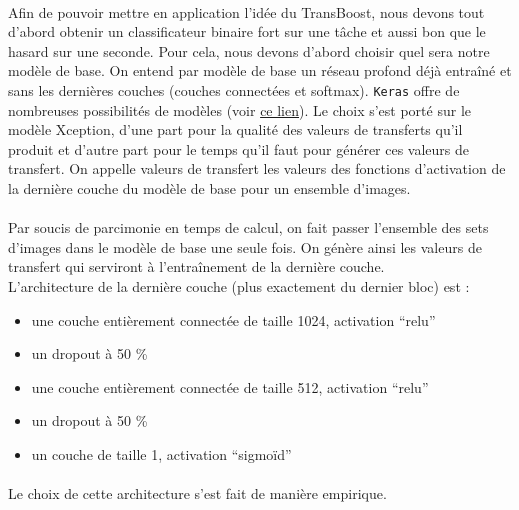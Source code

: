 \documentclass[11 pt]{article}
\begin{document}
\paragraph{}Afin de pouvoir mettre en application l’idée du TransBoost, nous devons tout d’abord obtenir un classificateur binaire fort sur une tâche et aussi bon que le hasard sur une seconde. Pour cela, nous devons d’abord choisir quel sera notre modèle de base. On entend par modèle de base un réseau profond déjà entraîné et sans les dernières couches (couches connectées et softmax). \texttt{Keras} offre de nombreuses possibilités de modèles (voir \href{https://keras.io/applications/}{ce lien}). Le choix s’est porté sur le modèle Xception, d’une part pour la qualité des valeurs de transferts qu’il produit et d’autre part pour le temps qu’il faut pour générer ces valeurs de transfert. On appelle valeurs de transfert les valeurs des fonctions d’activation de la dernière couche du modèle de base pour un ensemble d’images.

\paragraph{}Par soucis de parcimonie en temps de calcul, on fait passer l’ensemble des sets d’images dans le modèle de base une seule fois. On génère ainsi les valeurs de transfert qui serviront à l’entraînement de la dernière couche. \\
L’architecture de la dernière couche (plus exactement du dernier bloc) est :\\ \medskip
\begin{samepage}
  \begin{itemize}
    \item une couche entièrement connectée de taille 1024, activation “relu”
    \nopagebreak
    \item un dropout à 50 \%
    \nopagebreak
    \item une couche entièrement connectée de taille 512, activation “relu”
    \nopagebreak
    \item un dropout à 50 \%
    \nopagebreak
    \item un couche de taille 1, activation “sigmoïd”
  \end{itemize}
\end{samepage}

\medskip

\paragraph{}Le choix de cette architecture s’est fait de manière empirique.\\
\end{document}
